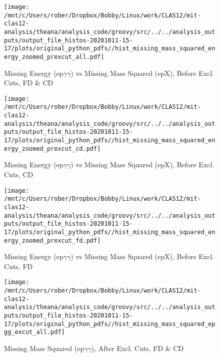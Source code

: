 \documentclass{article}
\begin{document}
\begin{landscape}
    \begin{figure}[h]
        \centering

        \texttt{[image: /mnt/c/Users/rober/Dropbox/Bobby/Linux/work/CLAS12/mit-clas12-analysis/theana/analysis\_code/groovy/src/../../analysis\_outputs/output\_file\_histos-20201011-15-17/plots/original\_python\_pdfs//hist\_missing\_mass\_squared\_energy\_zoomed\_prexcut\_all.pdf]}
        \captionsetup{textformat=empty,labelformat=blank}
        \caption{Missing Energy (ep$\gamma$$\gamma$) vs Missing Mass Squared (epX), Before Excl. Cuts, FD \& CD}
    \end{figure}
    \clearpage
    
    \begin{figure}[h]
        \centering

        \texttt{[image: /mnt/c/Users/rober/Dropbox/Bobby/Linux/work/CLAS12/mit-clas12-analysis/theana/analysis\_code/groovy/src/../../analysis\_outputs/output\_file\_histos-20201011-15-17/plots/original\_python\_pdfs//hist\_missing\_mass\_squared\_energy\_zoomed\_prexcut\_cd.pdf]}
        \captionsetup{textformat=empty,labelformat=blank}
        \caption{Missing Energy (ep$\gamma$$\gamma$) vs Missing Mass Squared (epX), Before Excl. Cuts, CD}
    \end{figure}
    \clearpage
    
    \begin{figure}[h]
        \centering

        \texttt{[image: /mnt/c/Users/rober/Dropbox/Bobby/Linux/work/CLAS12/mit-clas12-analysis/theana/analysis\_code/groovy/src/../../analysis\_outputs/output\_file\_histos-20201011-15-17/plots/original\_python\_pdfs//hist\_missing\_mass\_squared\_energy\_zoomed\_prexcut\_fd.pdf]}
        \captionsetup{textformat=empty,labelformat=blank}
        \caption{Missing Energy (ep$\gamma$$\gamma$) vs Missing Mass Squared (epX), Before Excl. Cuts, FD}
    \end{figure}
    \clearpage
    
    \begin{figure}[h]
        \centering

        \texttt{[image: /mnt/c/Users/rober/Dropbox/Bobby/Linux/work/CLAS12/mit-clas12-analysis/theana/analysis\_code/groovy/src/../../analysis\_outputs/output\_file\_histos-20201011-15-17/plots/original\_python\_pdfs//hist\_missing\_mass\_squared\_epgg\_excut\_all.pdf]}
        \captionsetup{textformat=empty,labelformat=blank}
        \caption{Missing Mass Squared (ep$\gamma$$\gamma$), After Excl. Cuts, FD \& CD}
    \end{figure}
    \clearpage
    

\end{landscape}
\end{document}
